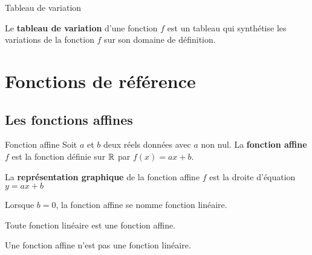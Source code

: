 \begin{pageCours}
\begin{DefT}{Tableau de variation}
\begin{minipage}{0.45\linewidth}
Le \textbf{tableau de variation} d'une fonction $f$ est un tableau qui synthétise les variations de la fonction $f$ sur son domaine de définition.

\end{minipage}
\hfill
\begin{minipage}{0.53\linewidth}


\end{minipage}  
\end{DefT}




\section{Fonctions de référence}


\subsection{Les fonctions affines}

\begin{minipage}{0.48\linewidth}

\begin{DefT}{Fonction affine}
Soit $a$ et $b$ deux réels données avec $a$ non nul.
La \textbf{fonction affine} $f$ est la fonction définie sur $\mathbb R$ par $f(x)=ax+b$.
 
La \textbf{représentation graphique} de la fonction affine $f$ est la droite d'équation $y=ax+b$ 
\end{DefT}

\begin{Rq}
Lorsque $b=0$, la fonction affine se nomme fonction linéaire.
\end{Rq}

\begin{Log}
Toute fonction linéaire est une fonction affine. 

Une fonction affine n'est pas une fonction linéaire.
\end{Log}

\end{minipage}
\hfill
\begin{minipage}{0.48\linewidth}
 



\end{minipage}
\end{pageCours}
